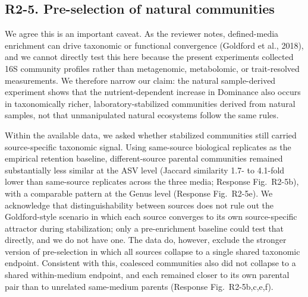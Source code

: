 \subsection*{R2-5. Pre-selection of natural communities}


\responselabel
We agree this is an important caveat. As the reviewer notes, defined-media enrichment can drive taxonomic or functional convergence (Goldford et al., 2018), and we cannot directly test this here because the present experiments collected 16S community profiles rather than metagenomic, metabolomic, or trait-resolved measurements. We therefore narrow our claim: the natural sample-derived experiment shows that the nutrient-dependent increase in Dominance also occurs in taxonomically richer, laboratory-stabilized communities derived from natural samples, not that unmanipulated natural ecosystems follow the same rules.

Within the available data, we asked whether stabilized communities still carried source-specific taxonomic signal. Using same-source biological replicates as the empirical retention baseline, different-source parental communities remained substantially less similar at the ASV level (Jaccard similarity 1.7- to 4.1-fold lower than same-source replicates across the three media; Response Fig.~R2-5b), with a comparable pattern at the Genus level (Response Fig.~R2-5e). We acknowledge that distinguishability between sources does not rule out the Goldford-style scenario in which each source converges to its own source-specific attractor during stabilization; only a pre-enrichment baseline could test that directly, and we do not have one. The data do, however, exclude the stronger version of pre-selection in which all sources collapse to a single shared taxonomic endpoint. Consistent with this, coalesced communities also did not collapse to a shared within-medium endpoint, and each remained closer to its own parental pair than to unrelated same-medium parents (Response Fig.~R2-5b,c,e,f).

